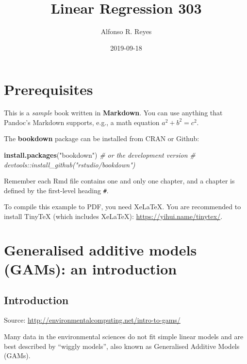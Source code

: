 \documentclass[]{book}
\title{Linear Regression 303}
\author{Alfonso R. Reyes}
\date{2019-09-18}
\newenvironment{Shaded}{\begin{snugshade}}{\end{snugshade}}
\newcommand{\CommentTok}[1]{\textcolor[rgb]{0.56,0.35,0.01}{\textit{#1}}}
\newcommand{\KeywordTok}[1]{\textcolor[rgb]{0.13,0.29,0.53}{\textbf{#1}}}
\newcommand{\NormalTok}[1]{#1}
\newcommand{\StringTok}[1]{\textcolor[rgb]{0.31,0.60,0.02}{#1}}
\begin{document}
\maketitle

{
\setcounter{tocdepth}{1}
\tableofcontents
}
\hypertarget{prerequisites}{%
\chapter*{Prerequisites}\label{prerequisites}}

This is a \emph{sample} book written in \textbf{Markdown}. You can use anything that Pandoc's Markdown supports, e.g., a math equation \(a^2 + b^2 = c^2\).

The \textbf{bookdown} package can be installed from CRAN or Github:

\begin{Shaded}
\begin{Highlighting}[]
\KeywordTok{install.packages}\NormalTok{(}\StringTok{"bookdown"}\NormalTok{)}
\CommentTok{# or the development version}
\CommentTok{# devtools::install_github("rstudio/bookdown")}
\end{Highlighting}
\end{Shaded}

Remember each Rmd file contains one and only one chapter, and a chapter is defined by the first-level heading \texttt{\#}.

To compile this example to PDF, you need XeLaTeX. You are recommended to install TinyTeX (which includes XeLaTeX): \url{https://yihui.name/tinytex/}.

\hypertarget{generalised-additive-models-gams-an-introduction}{%
\chapter{Generalised additive models (GAMs): an introduction}\label{generalised-additive-models-gams-an-introduction}}

\hypertarget{introduction}{%
\section{Introduction}\label{introduction}}

Source: \url{http://environmentalcomputing.net/intro-to-gams/}

Many data in the environmental sciences do not fit simple linear models and are best described by ``wiggly models'', also known as Generalised Additive Models (GAMs).
\end{document}
